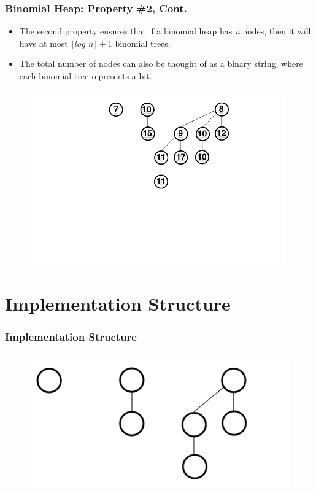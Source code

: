 \documentclass[13pt]{beamer}
\begin{document}
\begin{frame}
\end{frame}

\begin{frame}
\frametitle{Binomial Heap: Property \#2, Cont.}
  \begin{itemize}
    \item The second property ensures that if a binomial heap has \textit{n} nodes, then it will have at most $\lfloor \textit{log n} \rfloor + 1$ binomial trees.
    \item The total number of nodes can also be thought of as a binary string, where each binomial tree represents a bit.
  \end{itemize}

  \begin{figure}
    \includegraphics[height=7.5cm]{./img/bheap.png}
  \end{figure}

\end{frame}

\section{Implementation Structure} %
\begin{frame}
\frametitle{Implementation Structure}
  
\begin{figure}
    \includegraphics[height=6cm]{./img/structimp.png}
\end{figure}

\end{frame}
\end{document}
